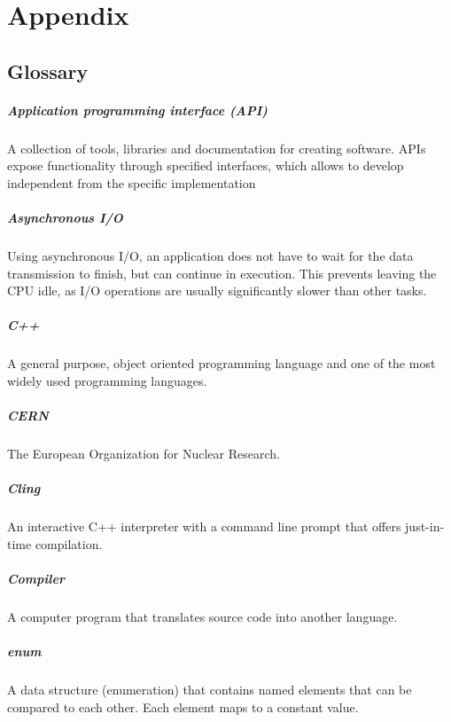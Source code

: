 \chapter{Appendix}
\section{Glossary}
\paragraph{Application programming interface (API)}
A collection of tools, libraries and documentation for creating software. APIs expose functionality through specified interfaces, which allows to develop independent from the specific implementation

\paragraph{Asynchronous I/O}
Using asynchronous I/O, an application does not have to wait for the data transmission to finish, but can continue in execution. This prevents leaving the CPU idle, as I/O operations are usually significantly slower than other tasks.

\paragraph{C++}
A general purpose, object oriented programming language and one of the most widely used programming languages.

\paragraph{CERN}
The European Organization for Nuclear Research.

\paragraph{Cling}
An interactive C++ interpreter with a command line prompt that offers just-in-time compilation.

\paragraph{Compiler}
A computer program that translates source code into another language.

\paragraph{enum}
A data structure (enumeration) that contains named elements that can be compared to each other. Each element maps to a constant value.

